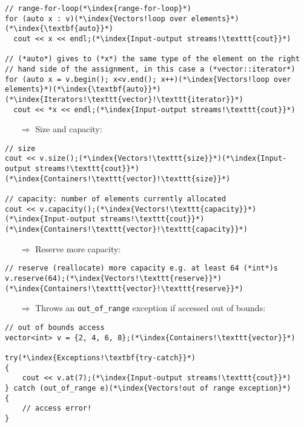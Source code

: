 \documentclass[10pt]{article}
\begin{document}
\begin{lstlisting}
// range-for-loop(*\index{range-for-loop}*)
for (auto x : v)(*\index{Vectors!loop over elements}*)(*\index{\textbf{auto}}*)
  cout << x << endl;(*\index{Input-output streams!\texttt{cout}}*)

// (*auto*) gives to (*x*) the same type of the element on the right
// hand side of the assignment, in this case a (*vector::iterator*)
for (auto x = v.begin(); x<v.end(); x++)(*\index{Vectors!loop over elements}*)(*\index{\textbf{auto}}*)(*\index{Iterators!\texttt{vector}!\texttt{iterator}}*)
  cout << *x << endl;(*\index{Input-output streams!\texttt{cout}}*)
\end{lstlisting}
\begin{enumerate}
\item[$\Rightarrow$] Size and capacity:
\end{enumerate}
\begin{lstlisting}
// size
cout << v.size();(*\index{Vectors!\texttt{size}}*)(*\index{Input-output streams!\texttt{cout}}*)(*\index{Containers!\texttt{vector}!\texttt{size}}*)

// capacity: number of elements currently allocated
cout << v.capacity();(*\index{Vectors!\texttt{capacity}}*)(*\index{Input-output streams!\texttt{cout}}*)(*\index{Containers!\texttt{vector}!\texttt{capacity}}*)
\end{lstlisting}
\begin{enumerate}
\item[$\Rightarrow$] Reserve more capacity:
\end{enumerate}
\begin{lstlisting}
// reserve (reallocate) more capacity e.g. at least 64 (*int*)s
v.reserve(64);(*\index{Vectors!\texttt{reserve}}*)(*\index{Containers!\texttt{vector}!\texttt{reserve}}*)
\end{lstlisting}
\begin{enumerate}
\item[$\Rightarrow$] Throws an \texttt{out\_of\_range} exception if accessed out of bounds:
\end{enumerate}
\begin{lstlisting}
// out of bounds access
vector<int> v = {2, 4, 6, 8};(*\index{Containers!\texttt{vector}}*)

try(*\index{Exceptions!\textbf{try-catch}}*)
{
    cout << v.at(7);(*\index{Input-output streams!\texttt{cout}}*)
} catch (out_of_range e)(*\index{Vectors!out of range exception}*)
{
    // access error!
}
\end{lstlisting}
%
%
\end{document}

